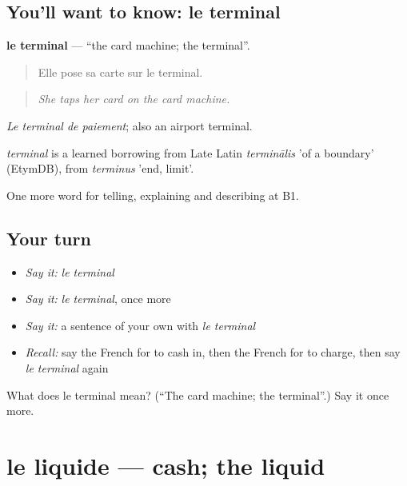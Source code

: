 \subsection*{You'll want to know: le terminal}
\textbf{le terminal} — \textquotedblleft{}the card machine; the terminal\textquotedblright{}.

\begin{quote}
Elle pose sa carte sur le terminal.
\end{quote}

\begin{quote}
\emph{She taps her card on the card machine.}
\end{quote}

\emph{Le terminal de paiement}; also an airport terminal.

\begin{cousinweb}
\emph{terminal} is a learned borrowing from Late Latin \emph{terminālis} 'of a boundary' (EtymDB), from \emph{terminus} 'end, limit'.
\end{cousinweb}

\begin{grammarlens}[title={What you've built}]
One more word for telling, explaining and describing at B1.
\end{grammarlens}

\subsection*{Your turn}
\begin{itemize}
\raggedright
  \item \emph{Say it:} \emph{le terminal}
  \item \emph{Say it:} \emph{le terminal}, once more
  \item \emph{Say it:} a sentence of your own with \emph{le terminal}
  \item \emph{Recall:} say the French for to cash in, then the French for to charge, then say \emph{le terminal} again
\end{itemize}

\begin{tcolorbox}[breakable,colback=teal!4,colframe=teal!35!black,title={Before you move on}]
What does le terminal mean? (\textquotedblleft{}The card machine; the terminal\textquotedblright{}.) Say it once more.
\end{tcolorbox}
\section[le liquide]{le liquide — cash; the liquid}

